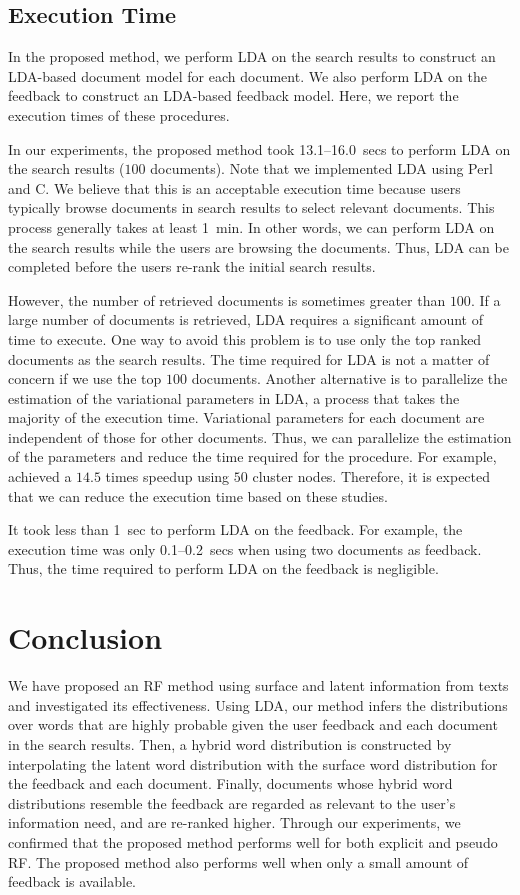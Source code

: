 \documentclass[english]{jnlp_1.4_rep}
\begin{document}
\subsection{Execution Time}
\label{ssec:execution_time}

In the proposed method, we perform LDA on the search results to
construct an LDA-based document model for each document. We also perform
LDA on the feedback to construct an LDA-based feedback model. Here, we
report the execution times of these procedures.

In our experiments, the proposed method took 13.1--16.0~secs to perform
LDA on the search results ($100$ documents). Note that we implemented
LDA using Perl and C. We believe that this is an acceptable execution
time because users typically browse documents in search results to
select relevant documents. This process generally takes at least
1~min. In other words, we can perform LDA on the search results while
the users are browsing the documents. Thus, LDA can be completed before
the users re-rank the initial search results.

However, the number of retrieved documents is sometimes greater than
$100$. If a large number of documents is retrieved, LDA requires a
significant amount of time to execute. One way to avoid this problem is
to use only the top ranked documents as the search results. The time
required for LDA is not a matter of concern if we use the top $100$
documents. Another alternative is to parallelize the estimation of the
variational parameters in LDA, a process that takes the majority of the
execution time. Variational parameters for each document are independent
of those for other documents. Thus, we can parallelize the estimation of
the parameters and reduce the time required for the procedure. For
    example,  achieved a $14.5$
times speedup using $50$ cluster nodes. Therefore, it is expected that
we can reduce the execution time based on these studies.

It took less than 1~sec to perform LDA on the feedback. For example, the
execution time was only 0.1--0.2~secs when using two documents as
feedback. Thus, the time required to perform LDA on the feedback is
negligible.


\section{Conclusion}
\label{sec:cncl}

We have proposed an RF method using surface and latent information from
texts and investigated its effectiveness. Using LDA, our method infers
the distributions over words that are highly probable given the user
feedback and each document in the search results. Then, a hybrid word
distribution is constructed by interpolating the latent word
distribution with the surface word distribution for the feedback and
each document. Finally, documents whose hybrid word distributions
resemble the feedback are regarded as relevant to the user's information
need, and are re-ranked higher. Through our experiments, we confirmed
that the proposed method performs well for both explicit and pseudo
RF. The proposed method also performs well when only a small amount of
feedback is available.
\end{document}
